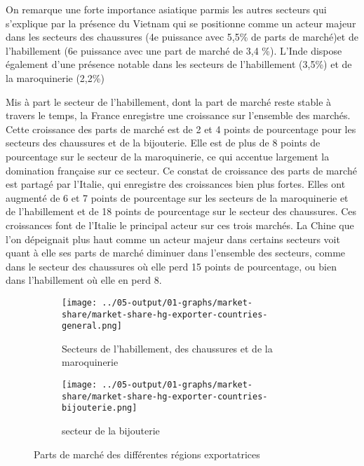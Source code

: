 \documentclass[french,10pt,a4paper]{article}
\begin{document}
On remarque une forte importance asiatique parmis les autres secteurs qui s'explique par la présence du Vietnam qui se positionne comme un acteur majeur dans les secteurs des chaussures (4e puissance avec 5,5\% de parts de marché)et de l'habillement (6e puissance avec une part de marché de 3,4 \%). L'Inde dispose également d'une présence notable dans les secteurs de l'habillement (3,5\%) et de la maroquinerie (2,2\%)

\medskip

Mis à part le secteur de l'habillement, dont la part de marché reste stable à travers le temps, la France enregistre une croissance sur l'ensemble des marchés. Cette croissance des parts de marché est de 2 et 4 points de pourcentage pour les secteurs des chaussures et de la bijouterie. Elle est de plus de 8 points de pourcentage sur le secteur de la maroquinerie, ce qui accentue largement la domination française sur ce secteur. Ce constat de croissance des parts de marché est partagé par l'Italie, qui enregistre des croissances bien plus fortes. Elles ont augmenté de 6 et 7 points de pourcentage sur les secteurs de la maroquinerie et de l'habillement et de 18 points de pourcentage sur le secteur des chaussures. Ces croissances font de l'Italie le principal acteur sur ces trois marchés. La Chine que l'on dépeignait plus haut comme un acteur majeur dans certains secteurs voit quant à elle ses parts de marché diminuer dans l'ensemble des secteurs, comme dans le secteur des chaussures où elle perd 15 points de pourcentage, ou bien dans l'habillement où elle en perd 8. 

\begin{figure}[!h]
  \centering
  \begin{subfigure}{\textwidth}
    \centering        \texttt{[image: ../05-output/01-graphs/market-share/market-share-hg-exporter-countries-general.png]}
    \caption{Secteurs de l'habillement, des chaussures et de la maroquinerie}
    \label{fig:market-share-hg-exporter-countries-general}
  \end{subfigure}
  \vspace{0.5cm}
  \begin{subfigure}{\textwidth}
    \centering \texttt{[image: ../05-output/01-graphs/market-share/market-share-hg-exporter-countries-bijouterie.png]}
 \caption{secteur de la bijouterie}
 \label{fig:market-share-hg-exporter-countries-bijouterie}
  \end{subfigure}
  \caption{Parts de marché des différentes régions exportatrices}
  \label{fig:market-share}
\end{figure}
\end{document}

